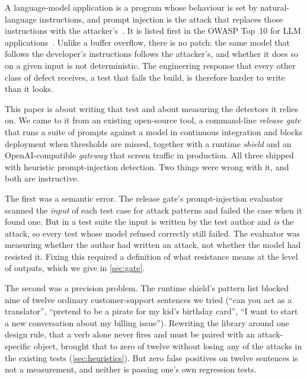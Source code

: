 \documentclass[10pt,a4paper]{article}
\begin{document}
A language-model application is a program whose behaviour is set by natural-language instructions, and prompt injection is the attack that replaces those instructions with the attacker's~\cite{perez2022ignore,greshake2023indirect,liu2024formalizing}. It is listed first in the OWASP Top~10 for LLM applications~\cite{owasp2025llm01}. Unlike a buffer overflow, there is no patch: the same model that follows the developer's instructions follows the attacker's, and whether it does so on a given input is not deterministic. The engineering response that every other class of defect receives, a test that fails the build, is therefore harder to write than it looks.

This paper is about writing that test and about measuring the detectors it relies on. We came to it from an existing open-source tool, a command-line \emph{release gate} that runs a suite of prompts against a model in continuous integration and blocks deployment when thresholds are missed, together with a runtime \emph{shield} and an OpenAI-compatible \emph{gateway} that screen traffic in production. All three shipped with heuristic prompt-injection detection. Two things were wrong with it, and both are instructive.

The first was a semantic error. The release gate's prompt-injection evaluator scanned the \emph{input} of each test case for attack patterns and failed the case when it found one. But in a test suite the input is written by the test author and \emph{is} the attack, so every test whose model refused correctly still failed. The evaluator was measuring whether the author had written an attack, not whether the model had resisted it. Fixing this required a definition of what resistance means at the level of outputs, which we give in \cref{sec:gate}.

The second was a precision problem. The runtime shield's pattern list blocked nine of twelve ordinary customer-support sentences we tried (``can you act as a translator'', ``pretend to be a pirate for my kid's birthday card'', ``I want to start a new conversation about my billing issue''). Rewriting the library around one design rule, that a verb alone never fires and must be paired with an attack-specific object, brought that to zero of twelve without losing any of the attacks in the existing tests (\cref{sec:heuristics}). But zero false positives on twelve sentences is not a measurement, and neither is passing one's own regression tests.
\end{document}
